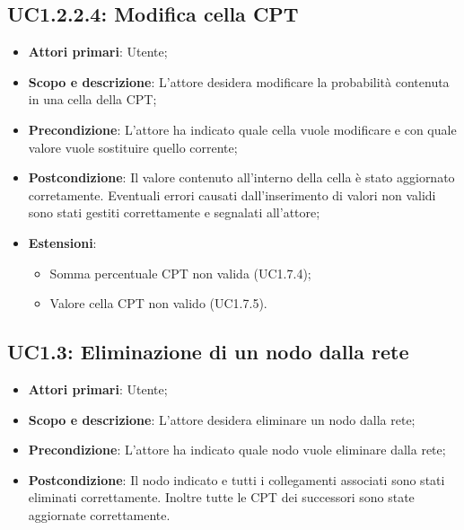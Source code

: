 \subsection{UC1.2.2.4: Modifica cella CPT} 
\begin{itemize} 
	\item{\textbf{Attori primari}: Utente;} 
	\item{\textbf{Scopo e descrizione}: L'attore desidera modificare la probabilità contenuta in una cella della CPT;} 
	\item{\textbf{Precondizione}: L'attore ha indicato quale cella vuole modificare e con quale valore vuole sostituire quello corrente;} 
	\item{\textbf{Postcondizione}: Il valore contenuto all'interno della cella è stato aggiornato corretamente. Eventuali errori causati dall'inserimento di valori non validi sono stati gestiti correttamente e segnalati all'attore;}
	\item{\textbf{Estensioni}:
		\begin{itemize}
			\item{Somma percentuale CPT non valida (UC1.7.4);}
			\item{Valore cella CPT non valido (UC1.7.5).}
		\end{itemize}
	}
\end{itemize} 
\subsection{UC1.3: Eliminazione di un nodo dalla rete} 
\begin{itemize} 
	\item{\textbf{Attori primari}: Utente;} 
	\item{\textbf{Scopo e descrizione}: L'attore desidera eliminare un nodo dalla rete;} 
	\item{\textbf{Precondizione}: L'attore ha indicato quale nodo vuole eliminare dalla rete;} 
	\item{\textbf{Postcondizione}: Il nodo indicato e tutti i collegamenti associati sono stati eliminati correttamente. Inoltre tutte le CPT dei successori sono state aggiornate correttamente.} 
\end{itemize} 

